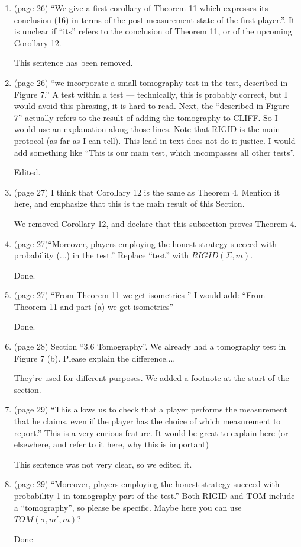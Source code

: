 \documentclass[12pt]{article}
\begin{document}
\begin{enumerate}
	
 \item (page 26) ``We give a first corollary of Theorem 11 which expresses its conclusion (16) in terms of the post-measurement
state of the first player.''. It is unclear if ``its'' refers to the conclusion of Theorem 11, or of the upcoming Corollary 12.

{\color{blue} This sentence has been removed.}

\item (page 26) ``we incorporate a
small tomography test in the test, described in Figure 7.'' A test within a test --- technically, this is probably correct, but I would avoid this phrasing, it is hard to read. Next, the ``described in Figure 7'' actually refers to the result of adding the tomography to CLIFF. So I would use an explanation along those lines. Note that RIGID is the main protocol (as far as I can tell). This lead-in text does not do it justice. I would add something like ``This is our main test, which incompasses all other tests''.

{\color{blue} Edited.}

\item (page 27) I think that Corollary 12 is the same as Theorem 4. Mention it here, and emphasize that this is the main result of this Section.

{\color{blue} We removed Corollary 12, and declare that this subsection proves Theorem 4.}

\item (page 27)``Moreover, players employing the honest strategy succeed with probability (...) in the test.'' Replace ``test'' with $RIGID(\Sigma,m)$.

{\color{blue} Done.}

\item (page 27) ``From Theorem 11 we get isometries '' I would add: ``From Theorem 11 and part (a) we get isometries''

{\color{blue} Done.}

\item (page 28) Section ``3.6 Tomography''. We already had a tomography test in Figure 7 (b). Please explain the difference....

{\color{blue} They're used for different purposes. We added a footnote at the start of the section.}


\item (page 29) ``This allows us
to check that a player performs the measurement that he claims, even if the player has the choice of which
measurement to report.'' This is a very curious feature. It would be great to explain here (or elsewhere, and refer to it here, why this is important)

{\color{blue} This sentence was not very clear, so we edited it.}

\item (page 29) ``Moreover, players employing the honest strategy succeed with probability 1 in tomography part of the
test.'' Both RIGID and TOM include a ``tomography'', so please be specific. Maybe here you can use $TOM(\sigma,m',m)$?

{\color{blue} Done}

\end{enumerate}
\end{document}
